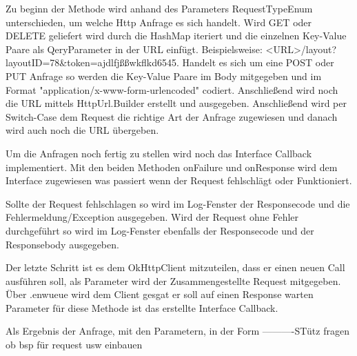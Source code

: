 Zu beginn der Methode wird anhand des Parameters RequestTypeEnum unterschieden, um welche Http Anfrage es sich handelt. Wird GET oder DELETE geliefert wird durch die HashMap iteriert und die einzelnen Key-Value Paare als QeryParameter in der URL einfügt. Beispielsweise: <URL>/layout?layoutID=78&token=ajdlfjßßwkflkd6545.
Handelt es sich um eine POST oder PUT Anfrage so werden die Key-Value Paare im Body mitgegeben und im Format "application/x-www-form-urlencoded" codiert. Anschließend wird noch die URL mittels HttpUrl.Builder erstellt und ausgegeben. 
Anschließend wird per Switch-Case dem Request die richtige Art der Anfrage zugewiesen und danach wird auch noch die URL übergeben. 

Um die Anfragen noch fertig zu stellen wird noch das Interface Callback implementiert. Mit den beiden Methoden onFailure und onResponse wird dem Interface zugewiesen was passiert wenn der Request fehlschlägt oder Funktioniert. 

Sollte der Request fehlschlagen so wird im Log-Fenster der Responsecode und die Fehlermeldung/Exception ausgegeben. 
Wird der Request ohne Fehler durchgeführt so wird im Log-Fenster ebenfalls der Responsecode und der Responsebody ausgegeben.

Der letzte Schritt ist es dem OkHttpClient mitzuteilen, dass er einen neuen Call ausführen soll, als Parameter wird der Zusammengestellte Request mitgegeben. Über .enwueue wird dem Client gesgat er soll auf einen Response warten Parameter für diese Methode ist das erstellte Interface Callback.






Als Ergebnis der Anfrage, mit den Parametern, in der Form
----------STütz fragen ob bsp für request usw einbauen



